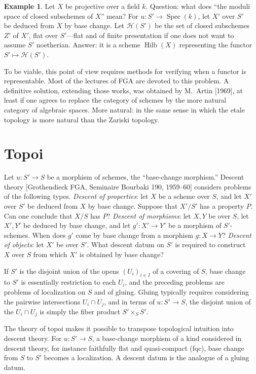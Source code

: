 \documentclass[11pt,a4paper]{article}
\theoremstyle{plain}
\theoremstyle{definition}
\newtheorem{example}[theorem]{Example}
\DeclareMathOperator{\Spec}{Spec}
\DeclareMathOperator{\Hilb}{Hilb}
\begin{document}
\begin{example}
Let $X$ be projective over a field $k$. Question: what does ``the moduli space of closed subschemes of $X$'' mean? For $u:S'\to\Spec(k)$, let $X'$ over $S'$ be deduced from $X$ by base change. Let $\mathcal{H}(S')$ be the set of closed subschemes $Z'$ of $X'$, flat over $S'$---flat and of finite presentation if one does not want to assume $S'$ noetherian. Answer: it is a scheme $\Hilb(X)$ representing the functor $S'\mapsto\mathcal{H}(S')$.
\end{example}

To be viable, this point of view requires methods for verifying when a functor is representable. Most of the lectures of FGA are devoted to this problem. A definitive solution, extending those works, was obtained by M.~Artin [1969], at least if one agrees to replace the category of schemes by the more natural category of algebraic spaces. More natural: in the same sense in which the etale topology is more natural than the Zariski topology.

\section{Topoi}

Let $u:S'\to S$ be a morphism of schemes, the ``base-change morphism.'' Descent theory [Grothendieck FGA, Seminaire Bourbaki 190, 1959--60] considers problems of the following types. \emph{Descent of properties}: let $X$ be a scheme over $S$, and let $X'$ over $S'$ be deduced from $X$ by base change. Suppose that $X'/S'$ has a property $P$. Can one conclude that $X/S$ has $P$? \emph{Descent of morphisms}: let $X,Y$ be over $S$, let $X',Y'$ be deduced by base change, and let $g':X'\to Y'$ be a morphism of $S'$-schemes. When does $g'$ come by base change from a morphism $g:X\to Y$? \emph{Descent of objects}: let $X'$ be over $S'$. What descent datum on $S'$ is required to construct $X$ over $S$ from which $X'$ is obtained by base change?

If $S'$ is the disjoint union of the opens $(U_i)_{i\in I}$ of a covering of $S$, base change to $S'$ is essentially restriction to each $U_i$, and the preceding problems are problems of localization on $S$ and of gluing. Gluing typically requires considering the pairwise intersections $U_i\cap U_j$, and in terms of $u:S'\to S$, the disjoint union of the $U_i\cap U_j$ is simply the fiber product $S'\times_S S'$.

The theory of topoi makes it possible to transpose topological intuition into descent theory. For $u:S'\to S$, a base-change morphism of a kind considered in descent theory, for instance faithfully flat and quasi-compact (fqc), base change from $S$ to $S'$ becomes a localization. A descent datum is the analogue of a gluing datum.
\end{document}
